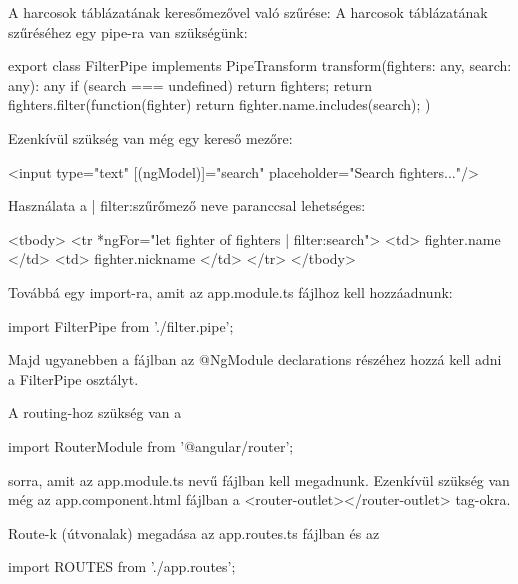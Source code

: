 A harcosok táblázatának keresőmezővel való szűrése:
A harcosok táblázatának szűréséhez egy pipe-ra van szükségünk:

\begin{cpp}
export class FilterPipe implements PipeTransform {
  transform(fighters: any, search: any): any {
    if (search === undefined) return fighters;
    return fighters.filter(function(fighter){
    	return fighter.name.includes(search);  })}}
\end{cpp}

Ezenkívül szükség van még egy kereső mezőre: 

\begin{cpp}
<input type="text" [(ngModel)]="search" 
placeholder="Search fighters..."/>
\end{cpp}

Használata a | filter:szűrőmező neve paranccsal lehetséges:

\begin{cpp}
<tbody>
      <tr *ngFor="let fighter of fighters | filter:search">
        <td>{{ fighter.name }}</td>
        <td>{{ fighter.nickname }}</td>
      </tr>
    </tbody>
\end{cpp}

Továbbá egy import-ra, amit az app.module.ts fájlhoz kell hozzáadnunk:

\begin{cpp}
import { FilterPipe } from './filter.pipe';
\end{cpp}

Majd ugyanebben a fájlban az @NgModule declarations részéhez hozzá kell adni a FilterPipe osztályt.

\begin{cpp}
@NgModule({
  declarations: [
    AppComponent,
    HomeComponent,
    FighterComponent,
    FilterPipe
\end{cpp}


A routing-hoz szükség van a

\begin{cpp}
import { RouterModule } from '@angular/router';
\end{cpp}

sorra, amit az app.module.ts nevű fájlban kell megadnunk.
Ezenkívül szükség van még az app.component.html fájlban a <router-outlet></router-outlet> tag-okra.

Route-k (útvonalak) megadása az app.routes.ts fájlban és az 

\begin{cpp}
import { ROUTES } from './app.routes'; 
\end{cpp}

